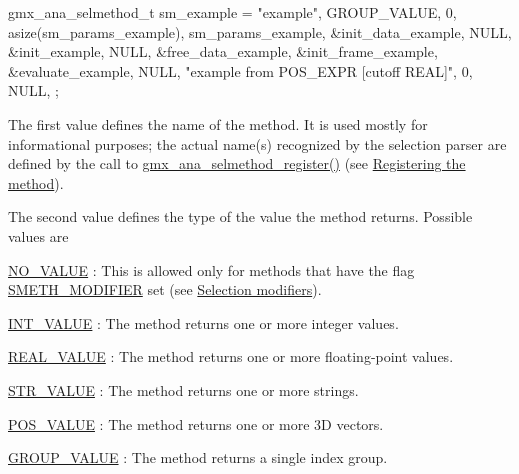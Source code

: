 \begin{DoxyCode}
 gmx_ana_selmethod_t sm_example = {
   "example", GROUP_VALUE, 0,
   asize(sm_params_example), sm_params_example,
   &init_data_example,
    NULL,
   &init_example,
    NULL,
   &free_data_example,
   &init_frame_example,
   &evaluate_example,
    NULL,
   {"example from POS_EXPR [cutoff REAL]", 0, NULL},
 };
\end{DoxyCode}


\-The first value defines the name of the method. \-It is used mostly for informational purposes; the actual name(s) recognized by the selection parser are defined by the call to \hyperlink{include_2selmethod_8h_a820231622b6b4dd57fba7570f705498f}{gmx\-\_\-ana\-\_\-selmethod\-\_\-register()} (see \hyperlink{selmethods_selmethods_register}{\-Registering the method}).

\-The second value defines the type of the value the method returns. \-Possible values are
\begin{DoxyItemize}
\item \hyperlink{share_2template_2gromacs_2selvalue_8h_a70b42b87d434580bf1493591857b8beca4d694119ce83b62d74ff06b5e017dca8}{\-N\-O\-\_\-\-V\-A\-L\-U\-E} \-: \-This is allowed only for methods that have the flag \hyperlink{share_2template_2gromacs_2selmethod_8h_aa5b18df47b72690889afd89f5e68694c}{\-S\-M\-E\-T\-H\-\_\-\-M\-O\-D\-I\-F\-I\-E\-R} set (see \hyperlink{selmethods_selmethods_modifiers}{\-Selection modifiers}).
\item \hyperlink{share_2template_2gromacs_2selvalue_8h_a70b42b87d434580bf1493591857b8becacd1ce0b084595a6072a57781dc7738a0}{\-I\-N\-T\-\_\-\-V\-A\-L\-U\-E} \-: \-The method returns one or more integer values.
\item \hyperlink{share_2template_2gromacs_2selvalue_8h_a70b42b87d434580bf1493591857b8beca7aa9587044cd6fd9c1f1690719a072cf}{\-R\-E\-A\-L\-\_\-\-V\-A\-L\-U\-E} \-: \-The method returns one or more floating-\/point values.
\item \hyperlink{share_2template_2gromacs_2selvalue_8h_a70b42b87d434580bf1493591857b8beca6f2f1fe9592d96990c9ac690c355bd08}{\-S\-T\-R\-\_\-\-V\-A\-L\-U\-E} \-: \-The method returns one or more strings.
\item \hyperlink{share_2template_2gromacs_2selvalue_8h_a70b42b87d434580bf1493591857b8beca31a47fbfbc85ad1472ce3d2a168fd1ec}{\-P\-O\-S\-\_\-\-V\-A\-L\-U\-E} \-: \-The method returns one or more 3\-D vectors.
\item \hyperlink{share_2template_2gromacs_2selvalue_8h_a70b42b87d434580bf1493591857b8beca70a2af6eafa48adfab506ceee60471f6}{\-G\-R\-O\-U\-P\-\_\-\-V\-A\-L\-U\-E} \-: \-The method returns a single index group.
\end{DoxyItemize}

